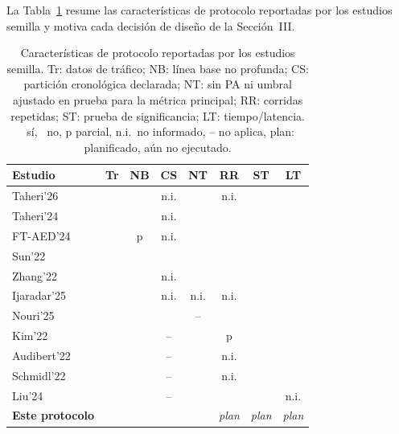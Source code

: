 \documentclass[conference]{IEEEtran}
\newcommand{\cm}{\ding{51}}          %
\newcommand{\xm}{\ding{55}}          %
\newcommand{\nr}{n.i.}               %
\newcommand{\pl}{\textit{plan}}            %
\begin{document}
La Tabla~\ref{tab:practices} resume las caracter\'isticas de protocolo
reportadas por los estudios semilla y motiva cada decisi\'on de dise\~no de la
Secci\'on~III.

\begin{table}[t]
\centering
\caption{Caracter\'isticas de protocolo reportadas por los estudios semilla.
Tr: datos de tr\'afico; NB: l\'inea base no profunda; CS: partici\'on cronol\'ogica
declarada; NT: sin PA ni umbral ajustado en prueba para la m\'etrica
principal; RR: corridas repetidas; ST: prueba de significancia; LT:
tiempo/latencia. \cm\ s\'i, \xm\ no, p parcial, \nr\ no informado, -- no
aplica, plan: planificado, a\'un no ejecutado.}
\label{tab:practices}
\setlength{\tabcolsep}{3.2pt}
\renewcommand{\arraystretch}{0.9}
\footnotesize
\begin{tabular}{@{}lccccccc@{}}
\toprule
Estudio & Tr & NB & CS & NT & RR & ST & LT \\
\midrule
Taheri'26 \cite{taheri2026applicability} & \cm & \cm & \nr & \xm & \nr & \xm & \xm \\
Taheri'24 \cite{taheri2024tpfds}         & \cm & \cm & \nr & \xm & \cm & \xm & \xm \\
FT-AED'24 \cite{coursey2024ftaed}        & \cm & p   & \nr & \cm & \xm & \xm & \xm \\
Sun'22 \cite{sun2022datacentric}         & \cm & \xm & \cm & \cm & \cm & \xm & \xm \\
Zhang'22 \cite{zhang2022automatic}       & \cm & \cm & \nr & \cm & \xm & \xm & \xm \\
Ijaradar'25 \cite{ijaradar2025datadriven}& \cm & \cm & \nr & \nr & \nr & \xm & \xm \\
Nouri'25 \cite{nouri2025sidmseq}         & \cm & \xm & \cm & --  & \xm & \xm & \cm \\
Kim'22 \cite{kim2022rigorous}            & \xm & \cm & --  & \xm & p   & \xm & \xm \\
Audibert'22 \cite{audibert2022deep}      & \xm & \cm & --  & \xm & \nr & \cm & \xm \\
Schmidl'22 \cite{schmidl2022anomaly}     & \xm & \cm & --  & \cm & \nr & \xm & \cm \\
Liu'24 \cite{liu2024elephant}            & \xm & \cm & --  & \cm & \xm & \cm & \nr \\
\midrule
\textbf{Este protocolo}                  & \cm & \cm & \cm & \cm & \pl & \pl & \pl \\
\bottomrule
\end{tabular}
\end{table}
\end{document}
